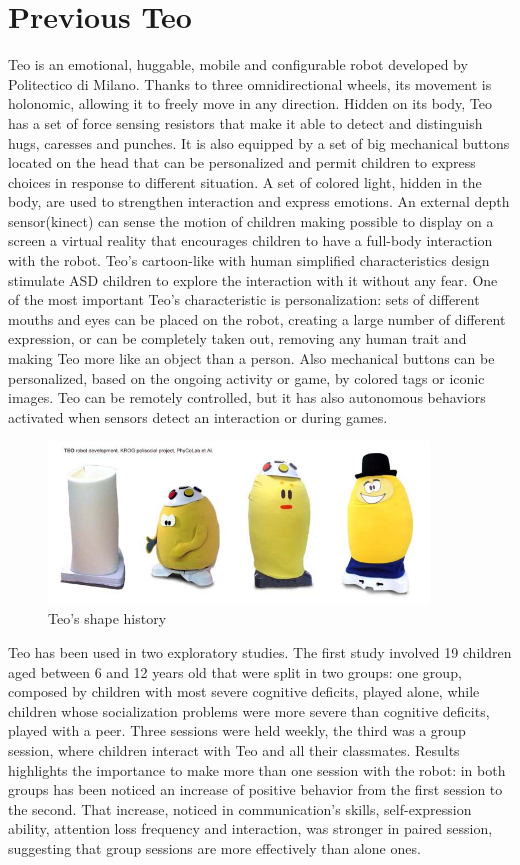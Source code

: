 \section{Previous Teo}
Teo is an emotional, huggable, mobile and configurable robot developed by Politectico di Milano. Thanks to three omnidirectional wheels, its movement is holonomic, allowing it to freely move in any direction. Hidden on its body, Teo has a set of force sensing resistors that make it able to detect and distinguish hugs, caresses and punches. It is also equipped by a set of big mechanical buttons located on the head that can be personalized and permit children to express choices in response to different situation. A set of colored light, hidden in the body, are used to strengthen interaction and express emotions. An external depth sensor(kinect) can sense the motion of children making possible to display on a screen a virtual reality that encourages children to have a full-body interaction with the robot. 
Teo's cartoon-like with human simplified characteristics design stimulate ASD children to explore the interaction with it without any fear. One of the most important Teo's characteristic is personalization: sets of different mouths and eyes can be placed on the robot, creating a large number of different expression, or can be completely taken out, removing any human trait and making Teo more like an object than a person. Also mechanical buttons can be personalized, based on the ongoing activity or game, by colored tags or iconic images.
Teo can be remotely controlled, but it has also autonomous behaviors activated when sensors detect an interaction or during games.
\begin{figure}[h]
	\centering
	\includegraphics[width=0.9\textwidth]{prevTeo}
	\caption{Teo's shape history}
	\label{fig:prevTeo}
\end{figure}
Teo has been used in two exploratory studies. The first study involved 19 children aged between 6 and 12 years old that were split in two groups: one group, composed by children with most severe cognitive deficits, played alone, while children whose socialization problems were more severe than cognitive deficits, played with a peer. Three sessions were held weekly, the third was a group session, where children interact with Teo and all their classmates. Results highlights the importance to make more than one session with the robot: in both groups has been noticed an increase of positive behavior from the first session to the second. That increase, noticed in communication's skills, self-expression ability, attention loss frequency and interaction, was stronger in paired session, suggesting that group sessions are more effectively than alone ones. 
